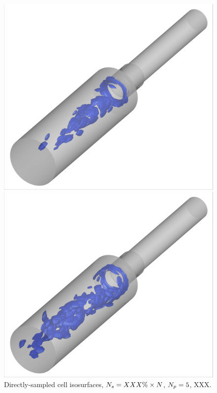 \begin{figure}
	\centering
	\begin{minipage}{0.45\linewidth}
		\includegraphics[width=0.99\linewidth,trim={0.5em 0.5em 0.5em 0.5em},clip]{Chapters/AdaptiveResults/Images/cvrc/iblank/iblank_iso_1075.png}
	\end{minipage}
	\begin{minipage}{0.45\linewidth}
		\includegraphics[width=0.99\linewidth,trim={0.5em 0.5em 0.5em 0.5em},clip]{Chapters/AdaptiveResults/Images/cvrc/iblank/iblank_iso_1100.png}
	\end{minipage}
	\caption{\label{fig:cvrcAdaptiveIBlankIso}Directly-sampled cell isosurfaces, $N_s = XXX\% \times N$, $N_p = 5$, XXX.}
\end{figure}

